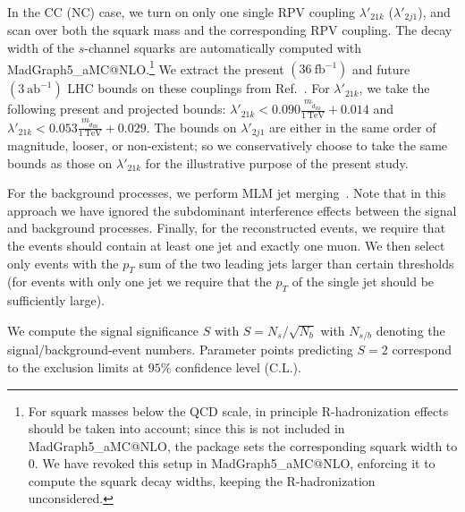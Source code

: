 \documentclass[a4paper,11pt]{article}
\makeatletter
\newcommand{\mgamcnlo}{MadGraph5\_aMC@NLO}
\makeatother
\begin{document}
In the CC (NC) case, we turn on only one single RPV coupling $\lambda'_{21k}$ ($\lambda'_{2j1}$), and scan over both the squark mass and the corresponding RPV coupling.
The decay width of the $s$-channel squarks are automatically computed with \mgamcnlo.\footnote{For squark masses below the QCD scale, in principle R-hadronization effects should be taken into account; since this is not included in \mgamcnlo, the package sets the corresponding squark width to 0. We have revoked this setup in \mgamcnlo, enforcing it to compute the squark decay widths, keeping the R-hadronization unconsidered.}
We extract the present $(36~\text{fb}^{-1})$ and future $(3~\text{ab}^{-1})$ LHC bounds on these couplings from Ref.~\cite{Bansal:2018dge}.
For $\lambda'_{21k}$, we take the following present and projected bounds: $\lambda'_{21k}<0.090\frac{m_{\tilde{d}_{Rk}}}{1~\text{TeV}}+0.014$ and $\lambda'_{21k}<0.053\frac{m_{\tilde{d}_{Rk}}}{1~\text{TeV}}+0.029$.
The bounds on $\lambda'_{2j1}$ are either in the same order of magnitude, looser, or non-existent; so we conservatively choose to take the same bounds as those on $\lambda'_{21k}$ for the illustrative purpose of the present study.


For the background processes, we perform MLM jet merging~\cite{Mangano:2006rw}.
Note that in this approach we have ignored the subdominant interference effects between the signal and background processes.
Finally, for the reconstructed events, we require that the events should contain at least one jet and exactly one muon.
We then select only events with the $p_T$ sum of the two leading jets larger than certain thresholds (for events with only one jet we require that the $p_T$ of the single jet should be sufficiently large).

We compute the signal significance $S$ with $S=N_s/\sqrt{N_b}$ with $N_{s/b}$ denoting the signal/background-event numbers.
Parameter points predicting $S=2$ correspond to the exclusion limits at $95\%$ confidence level (C.L.).
\end{document}
